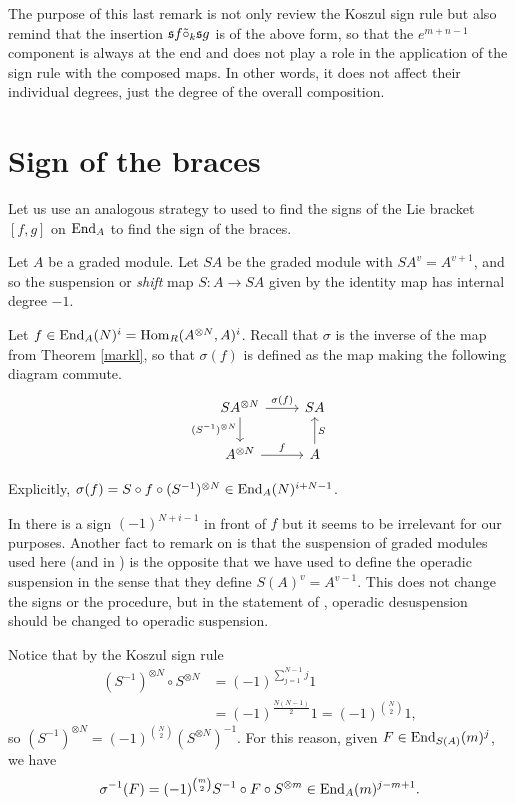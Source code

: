 \documentclass[Thesis.tex]{subfiles}
\begin{document}
The purpose of this last remark is not only review the Koszul sign rule but also remind that the insertion $\mathfrak{s} f\tilde{\circ}_{k} \mathfrak{s} g$ is of the above form, so that the $e^{m+n-1}$ component is always at the end and does not play a role in the application of the sign rule with the composed maps. In other words, it does not affect their individual degrees, just the degree of the overall composition. %

\section{Sign of the braces}\label{rw}



Let us use an analogous strategy to \cite{RW} used to find the signs of the Lie bracket $[f,g]$ on $\operatorname{End}_A$ to find the sign of the braces.

Let $A$ be a graded module. Let $SA$ be the graded module with $SA^v=A^{v+1}$, and so the suspension or \emph{shift} map $S:A\to SA$ given by the identity map has internal degree $-1$.

 Let $f\in \operatorname{End}_A(N)^i=\operatorname{Hom}_R(A^{\otimes N},A)^i$. Recall that $\sigma$ is the inverse of the map from Theorem \ref{markl}, so that $\sigma(f)$ is defined as the map making the following diagram commute.
\[
\begin{tikzcd}
SA^{\otimes N}\arrow[r, "\sigma(f)"]\arrow[d, "(S^{-1})^{\otimes N}"'] & SA\\
A^{\otimes N}\arrow[r,"f"] & A\arrow[u, "S"']
\end{tikzcd}
\]

Explicitly, $\sigma(f)=S\circ f\circ (S^{-1})^{\otimes N}\in \operatorname{End}_A(N)^{i+N-1}$. 

\begin{remark}
In \cite{RW} there is a sign $(-1)^{N+i-1}$ in front of $f$ but it seems to be irrelevant for our purposes. Another fact to remark on is that the suspension of graded modules used here (and in \cite{RW}) is the opposite that we have used to define the operadic suspension in the sense that they define $S(A)^v=A^{v-1}$. This does not change the signs or the procedure, but in the statement of , operadic desuspension should be changed to operadic suspension. %
\end{remark}


Notice that by the Koszul sign rule 
\begin{align*}
(S^{-1})^{\otimes N}\circ S^{\otimes N}&=(-1)^{\sum_{j=1}^{N-1} j}1\\
&=(-1)^{\frac{N(N-1)}{2}}1=(-1)^{\binom{N}{2}}1,
\end{align*}
so $(S^{-1})^{\otimes N}= (-1)^{\binom{N}{2}}(S^{\otimes N})^{-1}$. For this reason, given $F\in \operatorname{End}_{S(A)}(m)^j$, we have
\[
\sigma^{-1}(F)=(-1)^{\binom{m}{2}}S^{-1}\circ F\circ S^{\otimes m}\in \operatorname{End}_A(m)^{j-m+1}.
\]
\end{document}
